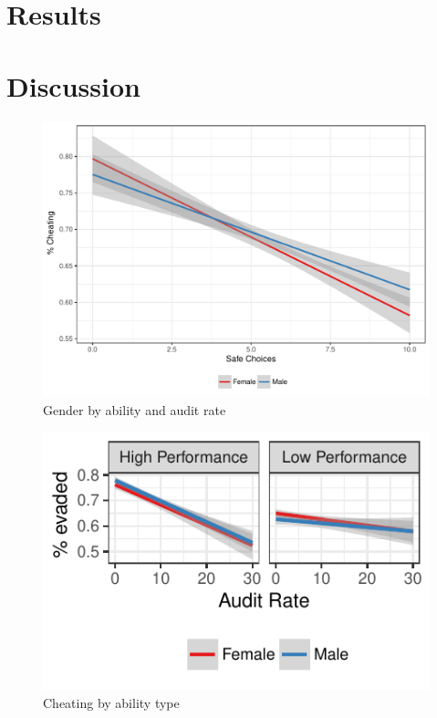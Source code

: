 \documentclass[9pt,twocolumn,twoside]{pnas-new}
\begin{document}
\section{Results}

\section{Discussion}


\begin{figure}[tbhp]
\centering
\includegraphics[width=.8\linewidth]{Figures/cheat_genderxsafechoices07Aug2017}
\caption{Gender by ability and audit rate}
\label{fig:frog}
\end{figure}


\begin{figure}[tbhp]
\centering
\includegraphics[width=.8\linewidth]{Figures/cheat_genderxability07Aug2017}
\caption{Cheating by ability type}\label{fig:side}
\end{figure}

\end{document}
